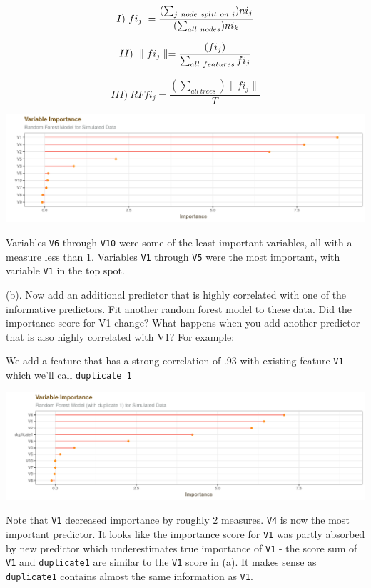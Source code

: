 \documentclass[]{report}
\begin{document}
\[
I) \  fi_j \ =\frac{ (\sum_{j \ node \ split \ on \ i}) ni_j }{ ( \sum_{all \ nodes}) ni_k}\\
\]

\[
II) \  \parallel  fi_j  \parallel = \frac{(fi_j)}{\sum_{all \ features}fi_j} \\
\]

\[
III) \ RFfi_j= \frac{ ( \sum_{all \ trees})\parallel  fi_j \parallel}{T}
\]

\includegraphics{Homework-Two2_files/figure-latex/kj-8.1a-1.pdf}

Variables \texttt{V6} through \texttt{V10} were some of the least
important variables, all with a measure less than 1. Variables
\texttt{V1} through \texttt{V5} were the most important, with variable
\texttt{V1} in the top spot.

\begin{subquestion}{(b).} Now add an additional predictor that is highly correlated with one of the informative predictors. Fit another random forest model to these data. Did the importance score for V1 change? What happens when you add another predictor that is also highly correlated with V1? For example:\end{subquestion}

We add a feature that has a strong correlation of .93 with existing
feature \texttt{V1} which we'll call \texttt{duplicate\ 1}

\includegraphics{Homework-Two2_files/figure-latex/kj-8.1b-1.pdf}

Note that \texttt{V1} decreased importance by roughly 2 measures.
\texttt{V4} is now the most important predictor. It looks like the
importance score for \texttt{V1} was partly absorbed by new predictor
which underestimates true importance of \texttt{V1} - the score sum of
\texttt{V1} and \texttt{duplicate1} are similar to the \texttt{V1} score
in (a). It makes sense as \texttt{duplicate1} contains almost the same
information as \texttt{V1}.
\end{document}
